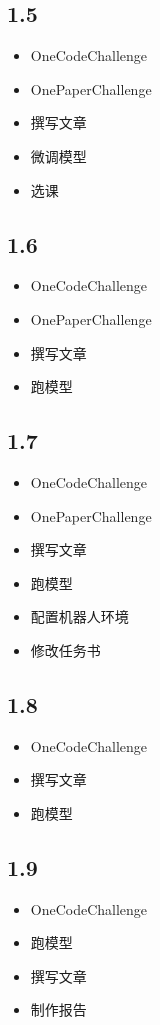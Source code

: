 \documentclass[UTF8]{ctexart}
\begin{document}
\subsection*{1.5}
\begin{itemize}
    \item OneCodeChallenge
    \item OnePaperChallenge
    \item 撰写文章
    \item 微调模型
    \item 选课
\end{itemize}

\subsection*{1.6}
\begin{itemize}
    \item OneCodeChallenge
    \item OnePaperChallenge
    \item 撰写文章
    \item 跑模型
\end{itemize}

\subsection*{1.7}
\begin{itemize}
    \item OneCodeChallenge
    \item OnePaperChallenge
    \item 撰写文章
    \item 跑模型
    \item 配置机器人环境
    \item 修改任务书
\end{itemize}

\subsection*{1.8}
\begin{itemize}
    \item OneCodeChallenge
    \item 撰写文章
    \item 跑模型
\end{itemize}

\subsection*{1.9}
\begin{itemize}
    \item OneCodeChallenge
    \item 跑模型
    \item 撰写文章
    \item 制作报告
\end{itemize}
\end{document}
